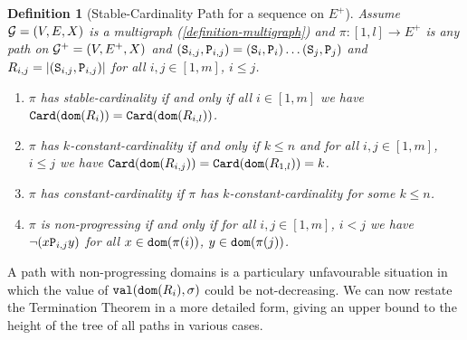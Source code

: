 \documentclass{lmcs}
\newtheorem{definition}[theorem]{Definition}
\begin{document}
\begin{definition}
[Stable-Cardinality Path for a sequence on $E^+$]
Assume ${\mathcal G}=(V,E,X)$ is a multigraph (\ref{definition-multigraph})
and $\pi:[1,l] \rightarrow E^+$ is any path on ${\mathcal G}^+=(V,E^+,X)$
and $({\tt S}_{i,j},{\tt P}_{i,j}) = ({\tt S}_i,{\tt P}_i) \ldots ({\tt S}_j,{\tt P}_j)$
and $R_{i,j} = {| ({\tt S}_{i,j},{\tt P}_{i,j}) |}$
for all $i,j \in[1,m]$, $i \le j$.


\begin{enumerate}

\item
$\pi$ has \emph{stable-cardinality} if and only if all $i \in[1,m]$ 
we have ${\tt Card}({\tt dom}(R_i)) = {\tt Card}({\tt dom}(R_{i,l}))$.

\item
$\pi$ has \emph{$k$-constant-cardinality} if and only if $k \le n$ and for all 
$i,j \in[1,m]$, $i \le j$ 
we have ${\tt Card}({\tt dom}(R_{i,j})) = {\tt Card}({\tt dom}(R_{1,l})) = k$.

\item
$\pi$ has \emph{constant-cardinality} if $\pi$ has $k$-constant-cardinality for some $k \le n$.

\item
$\pi$ is \emph{non-progressing} if and only if for all 
$i, j \in[1,m]$, $i < j$ we have $\neg (x {\tt P}_{i,j} y)$ for all 
$x \in {\tt dom}(\pi(i))$, $y \in {\tt dom}(\pi(j))$.
\end{enumerate}

\end{definition}

A path with non-progressing domains is a particulary unfavourable situation in which the
value of ${\tt val}({\tt dom}(R_i),\sigma)$ could be not-decreasing. 
We can now restate the Termination Theorem in a more detailed form, giving
an upper bound to the height of the tree of all paths in various cases.
 
\end{document}
